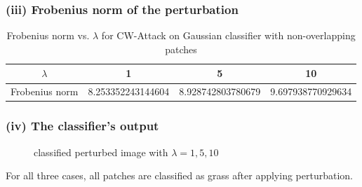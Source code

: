 \documentclass[11pt]{article}
\begin{document}
\subsubsection*{(iii) Frobenius norm of the perturbation}
\begin{table}[h]
	\centering
	\begin{tabular}{c|c|c|c}
		$\lambda$ & 1 & 5 & 10 \\
		\hline
		Frobenius norm & 8.253352243144604 & 8.928742803780679 & 9.697938770929634\\
	\end{tabular}
	\caption{Frobenius norm vs. $\lambda$ for CW-Attack on Gaussian classifier with non-overlapping patches}
\end{table}
\pagebreak
\subsubsection*{(iv) The classifier’s output}
\begin{figure}[h]
	\centering
	\caption{classified perturbed image with $\lambda = 1, 5, 10$}
\end{figure}
For all three cases, all patches are classified as grass after applying perturbation.
\end{document}
